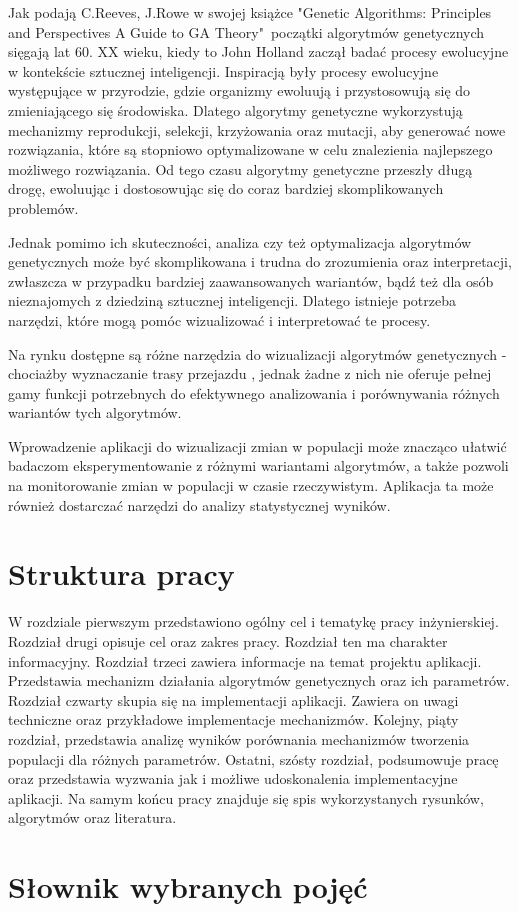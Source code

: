 Jak podają C.Reeves, J.Rowe w swojej książce "Genetic Algorithms: Principles and Perspectives
A Guide to GA Theory"\  początki algorytmów genetycznych sięgają lat 60. XX wieku, kiedy to John Holland zaczął badać procesy ewolucyjne w kontekście sztucznej inteligencji. 
Inspiracją były procesy ewolucyjne występujące w przyrodzie, gdzie organizmy ewoluują i przystosowują się do zmieniającego się środowiska. Dlatego algorytmy genetyczne wykorzystują mechanizmy reprodukcji, selekcji, krzyżowania oraz mutacji, aby generować nowe rozwiązania, które są stopniowo optymalizowane w celu znalezienia najlepszego możliwego rozwiązania.\linebreak
Od tego czasu algorytmy genetyczne przeszły długą drogę, ewoluując i dostosowując się do coraz bardziej skomplikowanych problemów.

Jednak pomimo ich skuteczności, analiza czy też optymalizacja algorytmów genetycznych może być skomplikowana i trudna do zrozumienia oraz interpretacji, zwłaszcza w przypadku bardziej zaawansowanych wariantów, bądź też dla osób nieznajomych z dziedziną sztucznej inteligencji. Dlatego istnieje potrzeba narzędzi, które mogą pomóc wizualizować i interpretować te procesy.

Na rynku dostępne są różne narzędzia do wizualizacji algorytmów genetycznych - chociażby wyznaczanie trasy przejazdu , jednak żadne z nich nie oferuje pełnej gamy funkcji potrzebnych do efektywnego analizowania i porównywania różnych wariantów tych algorytmów.

Wprowadzenie aplikacji do wizualizacji zmian w populacji może znacząco ułatwić badaczom eksperymentowanie z różnymi wariantami algorytmów, a także pozwoli na monitorowanie zmian w populacji w czasie rzeczywistym. Aplikacja ta może również dostarczać narzędzi do analizy statystycznej wyników.\\


\section{Struktura pracy}
W rozdziale pierwszym przedstawiono ogólny cel i tematykę pracy inżynierskiej. Rozdział drugi opisuje cel oraz zakres pracy. Rozdział ten ma charakter informacyjny. Rozdział trzeci zawiera informacje na temat projektu aplikacji. Przedstawia mechanizm działania algorytmów genetycznych oraz ich parametrów. Rozdział czwarty skupia się na implementacji aplikacji. Zawiera on uwagi techniczne oraz przykładowe implementacje mechanizmów. Kolejny, piąty rozdział, przedstawia analizę wyników porównania mechanizmów tworzenia populacji dla różnych parametrów. Ostatni, szósty rozdział, podsumowuje pracę oraz przedstawia wyzwania jak i możliwe udoskonalenia implementacyjne aplikacji. Na samym końcu pracy znajduje się spis wykorzystanych rysunków, algorytmów oraz literatura.

\newpage
\section{Słownik wybranych pojęć}